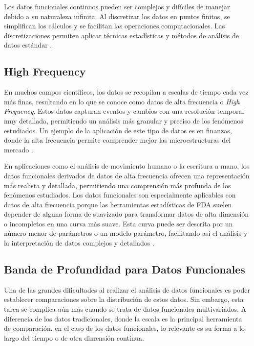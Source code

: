 Los datos funcionales continuos pueden ser complejos y difíciles de manejar debido a su naturaleza infinita. Al discretizar los datos en puntos finitos, se simplifican los cálculos y se facilitan las operaciones computacionales. Las discretizaciones permiten aplicar técnicas estadísticas y métodos de análisis de datos estándar  \cite{Aguilera2013}.

\subsection{High Frequency}

En muchos campos científicos, los datos se recopilan a escalas de tiempo cada vez más finas, resultando en lo que se conoce como datos de alta frecuencia o \textit{High Frequency}. Estos datos capturan eventos y cambios con una resolución temporal muy detallada, permitiendo un análisis más granular y preciso de los fenómenos estudiados. Un ejemplo de la aplicación de este tipo de datos es en finanzas, donde la alta frecuencia permite comprender mejor las microestructuras del mercado \cite{Tsay2000}.

 En aplicaciones como el análisis de movimiento humano o la escritura a mano, los datos funcionales derivados de datos de alta frecuencia ofrecen una representación más realista y detallada, permitiendo una comprensión más profunda de los fenómenos estudiados. Los datos funcionales son especialmente aplicables con datos de alta frecuencia porque las herramientas estadísticas de FDA suelen depender de alguna forma de suavizado para transformar datos de alta dimensión o incompletos en una curva más suave. Esta curva puede ser descrita por un número menor de parámetros o un modelo parámetro, facilitando así el análisis y la interpretación de datos complejos y detallados \cite{Miao2013}.

 

\subsection{Banda de Profundidad para Datos Funcionales}

Una de las grandes dificultades al realizar el análisis de datos funcionales es poder establecer comparaciones sobre la distribución de estos datos. Sin embargo, esta tarea se complica aún más cuando se trata de datos funcionales multivariados. A diferencia de los datos tradicionales, donde la escala es la principal herramienta de comparación, en el caso de los datos funcionales, lo relevante es su forma a lo largo del tiempo o de otra dimensión continua.

